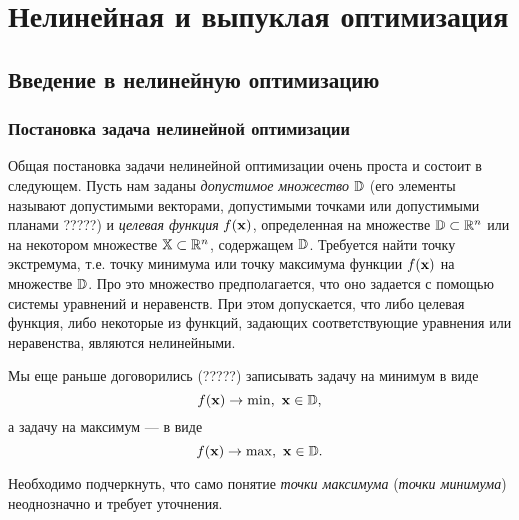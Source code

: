 \chapter{Нелинейная и выпуклая оптимизация}







\section{Введение в нелинейную оптимизацию}

\subsection{Постановка задача нелинейной оптимизации}

    Общая постановка задачи нелинейной оптимизации очень проста и
    состоит в следующем. Пусть нам
    заданы \emph{допустимое множество} $\mathbb{D}$ (его элементы называют
    допустимыми векторами, допустимыми точками или допустимыми планами ?????) и
    \emph{целевая функция} $f(\mathbf{x})$, определенная на множестве
    $\mathbb{D}\subset\mathbb{R}^{n}$ или на некотором множестве $\mathbb{X}\subset\mathbb{R}^{n}$,
    содержащем $\mathbb{D}$. Требуется найти точку экстремума, т.е.
    точку минимума или точку максимума
    функции $f(\mathbf{x})$ на  множестве $\mathbb{D}$. Про это множество
    предполагается, что оно задается с помощью системы уравнений и
    неравенств. При этом допускается, что либо целевая функция, либо
    некоторые из функций, задающих соответствующие уравнения или
    неравенства, являются нелинейными.

    Мы еще раньше договорились (?????) записывать задачу на минимум в виде
\begin{equation}
    \label{nel-zad-min}
    f(\mathbf{x})\rightarrow\min, \ \mathbf{x}\in\mathbb{D},
\end{equation}
    а задачу на максимум --- в виде
\begin{equation}
    \label{nel-zad-max}
    f(\mathbf{x})\rightarrow\max, \ \mathbf{x}\in\mathbb{D}.
\end{equation}



    Необходимо подчеркнуть, что само понятие \emph{точки максимума}
    (\emph{точки минимума}) неоднозначно и требует уточнения.

